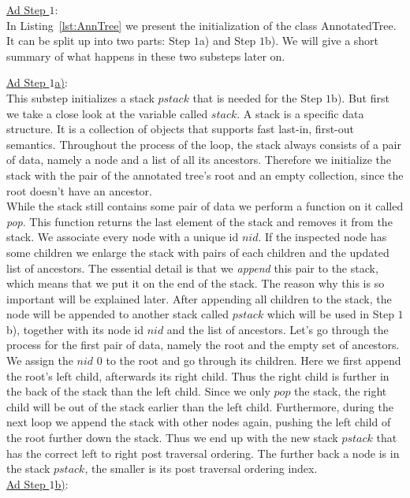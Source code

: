 \underline{Ad Step $1$}:\\
In Listing~\ref{lst:AnnTree} we present the initialization of the class AnnotatedTree. It can be split up into two parts: Step $1$a) and Step $1$b). We will give a short summary of what happens in these two substeps later on.

\underline{Ad Step $1$a)}:\\
This substep initializes a stack $pstack$ that is needed for the Step $1$b). But first we take a close look at the variable called $stack$. A stack is a specific data structure. It is a collection of objects that supports fast last-in, first-out semantics. Throughout the process of the loop, the stack always consists of a pair of data, namely a node and a list of all its ancestors. Therefore we initialize the stack with the pair of the annotated tree's root and an empty collection, since the root doesn't have an ancestor. \\
While the stack still contains some pair of data we perform a function on it called \textit{pop}. This function returns the last element of the stack and removes it from the stack. We associate every node with a unique id $nid$. If the inspected node has some children we enlarge the stack with pairs of each children and the updated list of ancestors. The essential detail is that we \textit{append} this pair to the stack, which means that we put it on the end of the stack. The reason why this is so important will be explained later. After appending all children to the stack, the node will be appended to another stack called $pstack$ which will be used in Step $1$b), together with its node id $nid$ and the list of ancestors.
Let's go through the process for the first pair of data, namely the root and the empty set of ancestors. We assign the $nid$ $0$ to the root and go through its children. Here we first append the root's left child, afterwards its right child. Thus the right child is further in the back of the stack than the left child. Since we only $pop$ the stack, the right child will be out of the stack earlier than the left child. Furthermore, during the next loop we append the stack with other nodes again, pushing the left child of the root further down the stack. Thus we end up with the new stack $pstack$ that has the correct left to right post traversal ordering. The further back a node is in the stack $pstack$, the smaller is its post traversal ordering index.
\\
\underline{Ad Step $1$b)}:\\
